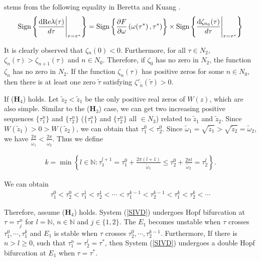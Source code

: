 \documentclass{CMHPhD-SIVD}
\begin{document}
 stems from the following equality in Beretta and Kuang \cite{beretta2002geometric}.
\begin{equation}\label{23}
\operatorname{Sign}\left\{\frac{\rm dRe \lambda(\tau)}{d\tau}\Bigg|_{\tau=\tau^*}\right\}=\operatorname{Sign}\left\{\frac{\partial F}{\partial \omega}\left(\omega(\tau^*\right),\tau^*)\right\}\times \operatorname{Sign}\left\{\frac{{\rm d} \zeta_{n_0}(\tau)}{d\tau}\Bigg|_{\tau=\tau^*}\right\}
\end{equation}

It is clearly observed that $\zeta{_n(0)}<0$. Furthermore, for all $\tau\in N_2$, $\zeta_n(\tau) > \zeta_{n+1}(\tau )$ and $n \in {N_0}$. Therefore, if $\zeta_0$ has no zero in $N_2$, the function $\zeta_n$ has no zero in $N_2$. If the function $\zeta_n(\tau)$ has positive zeros for some $n \in N_0$, then there is at least one zero $\tilde{\tau}$ satisfying $\zeta'_{\tilde{n}}(\tilde{\tau})>0$.

If ($\mathbf{H}_4$) holds. Let $\tilde{z}_2 < \tilde{z}_1$ be the only positive real zeros of $W(z)$, which are also simple. Similar to the ($\mathbf{H}_3$) case, we can get two increasing positive sequences $\{\tau_1^n\}$ and $\{\tau_2^n\}$ ($\{\tau_1^n\}$ and $\{\tau_2^n\}$ all $\in N_3$) related to $\tilde{z}_1$ and $\tilde{z}_2$. Since $W(\tilde{z}_1)>0>W(\tilde{z}_2)$, we can obtain that $\tau_1^0<\tau_2^0$. Since $\tilde{\omega}_1=\sqrt{\tilde{z}_1}>\sqrt{\tilde{z}_2}=\tilde{\omega}_2$, we have $\frac{2\pi}{\tilde{\omega}_1}<\frac{2\pi}{\tilde{\omega}_2}$. Thus we define

\begin{align*}
k=\min\left\{l\in \mathbb{N}:\tau_1^{l+1}=\tau_1^{0}+\frac{2\pi (l+1)}{\tilde{\omega}_1}\leq\tau_2^{0}+\frac{2\pi l}{\tilde{\omega}_2}=\tau_2^{l}\right\}.
\end{align*}

We can obtain
\begin{align*}
\tau_1^{0}<\tau_2^{0}<\tau_1^{1}<\tau_2^{1}<\cdots<\tau_1^{k-1}<\tau_2^{k-1}<\tau_1^{k}<\tau_2^{k}<\cdots
\end{align*}

Therefore, assume ($\mathbf{H}_4$) holds. System (\ref{SIVD}) undergoes Hopf bifurcation at $\tau=\tau_j^n$ for $l=\mathbb{N}$, $n\in\mathbb{N}$ and $j\in\{1, 2\}$. The $E_1$ becomes unstable when $\tau$ crosses $\tau_1^0, \cdots, \tau_1^k$ and $E_1$ is stable when $\tau$ crosses $\tau_2^0, \cdots, \tau_2^{k-1}$.  Furthermore, If there is $n>l\geq0$, such that $\tau_1^n=\tau_2^l=\tau^*$, then System (\ref{SIVD}) undergoes a double Hopf bifurcation at $E_1$ when $\tau = \tau^*$.
\end{document}
